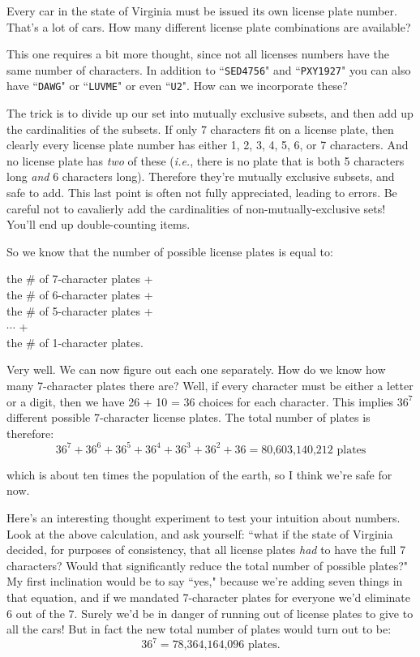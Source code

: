 Every car in the state of Virginia must be issued its own license plate
number. That's a lot of cars. How many different license plate combinations
are available?

This one requires a bit more thought, since not all licenses numbers have
the same number of characters. In addition to ``\texttt{SED4756}" and
``\texttt{PXY1927}" you can also have ``\texttt{DAWG}" or ``\texttt{LUVME}"
or even ``\texttt{U2}". How can we incorporate these?

The trick is to divide up our set into mutually exclusive subsets, and then
add up the cardinalities of the subsets. If only 7 characters fit on a
license plate, then clearly every license plate number has either 1, 2, 3,
4, 5, 6, or 7 characters. And no license plate has \textit{two} of these
(\textit{i.e.}, there is no plate that is both 5 characters long
\textit{and} 6 characters long). Therefore they're mutually exclusive
subsets, and safe to add. This last point is often not fully appreciated,
leading to errors. Be careful not to cavalierly add the cardinalities of
non-mutually-exclusive sets! You'll end up double-counting items.

So we know that the number of possible license plates is equal to:
\begin{center}
the \# of 7-character plates + \\
the \# of 6-character plates + \\
the \# of 5-character plates + \\
$\cdots$ + \\
the \# of 1-character plates.
\end{center}

Very well. We can now figure out each one separately. How do we know how
many 7-character plates there are? Well, if every character must be either
a letter or a digit, then we have 26 + 10 = 36 choices for each character.
This implies $36^7$ different possible 7-character license plates. The
total number of plates is therefore:
\[
36^7 + 36^6 + 36^5 + 36^4 + 36^3 + 36^2 + 36 = \text{80,603,140,212 plates}
\]

which is about ten times the population of the earth, so I think we're
safe for now.

Here's an interesting thought experiment to test your intuition about
numbers. Look at the above calculation, and ask yourself: ``what if the
state of Virginia decided, for purposes of consistency, that all license
plates \textit{had} to have the full 7 characters? Would that significantly
reduce the total number of possible plates?" My first inclination would be
to say ``yes," because we're adding seven things in that equation, and if
we mandated 7-character plates for everyone we'd eliminate 6 out of the 7.
Surely we'd be in danger of running out of license plates to give to all
the cars! But in fact the new total number of plates would turn out to be:
\[
36^7 = \text{78,364,164,096 plates}.
\]

